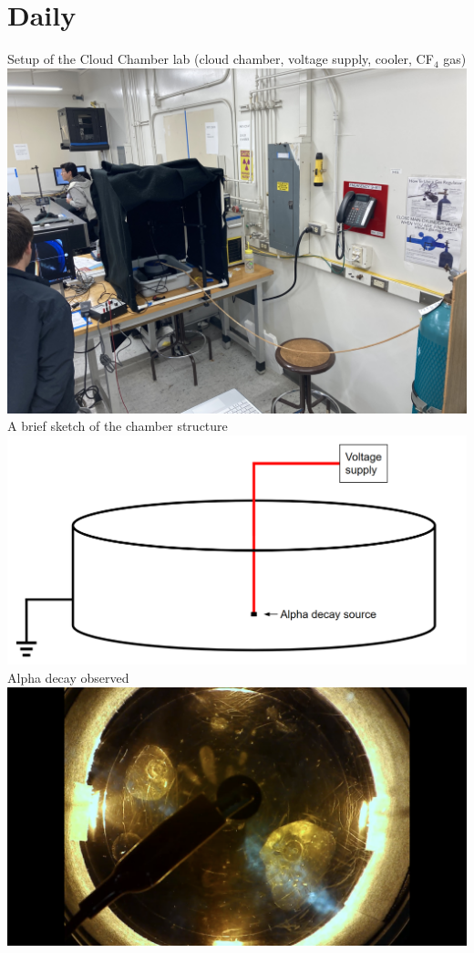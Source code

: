 \documentclass[a4paper]{tufte-handout}
\begin{document}
\section{Daily}
Setup of the Cloud Chamber lab (cloud chamber, voltage supply, cooler, CF$_4$ gas)
\\
\includegraphics[width = 1 \textwidth]{figures/day1_setup.JPG}
\\
A brief sketch of the chamber structure
\\
\includegraphics[width = 1 \textwidth]{figures/day1_chamber.png}
\\
Alpha decay observed
\\
\includegraphics[width = 1 \textwidth]{figures/day1_trajectory.PNG}
\\
\hrulefill
\end{document}
